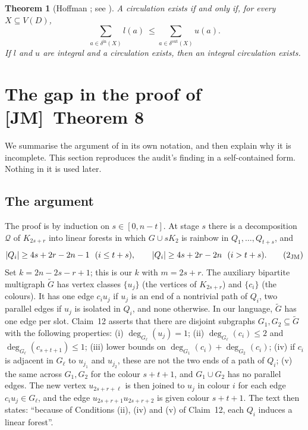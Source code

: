 \documentclass[11pt]{amsart}
\newtheorem{theorem}{Theorem}[section]
\theoremstyle{definition}
\theoremstyle{remark}
\newcommand{\Q}{\mathcal{Q}}
\newcommand{\JM}{\textup{[JM]}}
\begin{document}
\begin{theorem}[Hoffman \cite{Hoffman}; see {\cite[Ch.~11]{Schrijver}}]\label{thm:hoffman}
A circulation exists if and only if, for every $X\subseteq V(D)$,
\[
\sum_{a\in\delta^{\mathrm{in}}(X)} l(a)\ \le \sum_{a\in\delta^{\mathrm{out}}(X)} u(a).
\]
If $l$ and $u$ are integral and a circulation exists, then an integral circulation exists.
\end{theorem}

\section{The gap in the proof of \JM\ Theorem 8}\label{sec:gap}

We summarise the argument of \cite[pp.~8--9]{JM} in its own notation, and then explain why it
is incomplete. This section reproduces the audit's finding \cite[\S2.4]{A4} in a self-contained
form. Nothing in it is used later.

\subsection{The argument}
The proof is by induction on $s\in[0,n-t]$. At stage $s$ there is a decomposition $\Q$ of
$K_{2s+r}$ into linear forests in which $G\cup sK_2$ is rainbow in $Q_1,\dots,Q_{t+s}$, and
\[
|Q_i|\ge 4s+2r-2n-1\ \ (i\le t+s),\qquad |Q_i|\ge 4s+2r-2n\ \ (i>t+s). \tag{2$_{\mathrm{JM}}$}
\]
Set $k=2n-2s-r+1$; this is our $k$ with $m=2s+r$. The auxiliary bipartite multigraph
$\widetilde G$ has vertex classes $\{u_j\}$ (the vertices of $K_{2s+r}$) and $\{c_i\}$
(the colours). It has one edge $c_iu_j$ if $u_j$ is an end of a nontrivial path of $Q_i$, two
parallel edges if $u_j$ is isolated in $Q_i$, and none otherwise. In our language, $\widetilde G$
has one edge per slot. Claim~12 asserts that there are disjoint subgraphs
$G_1,G_2\subseteq\widetilde G$ with the following properties:
(i) $\deg_{G_\ell}(u_j)=1$;
(ii) $\deg_{G_\ell}(c_i)\le2$ and $\deg_{G_\ell}(c_{s+t+1})\le1$;
(iii) lower bounds on $\deg_{G_1}(c_i)+\deg_{G_2}(c_i)$;
(iv) if $c_i$ is adjacent in $G_\ell$ to $u_{j_1}$ and $u_{j_2}$, these are not the two ends of
a path of $Q_i$;
(v) the same across $G_1,G_2$ for the colour $s+t+1$, and $G_1\cup G_2$ has no parallel edges.
The new vertex $u_{2s+r+\ell}$ is then joined to $u_j$ in colour $i$ for each edge
$c_iu_j\in G_\ell$, and the edge $u_{2s+r+1}u_{2s+r+2}$ is given colour $s+t+1$.
The text then states: ``because of Conditions (ii), (iv) and (v) of Claim~12, each $Q_i$ induces
a linear forest''.
\end{document}
